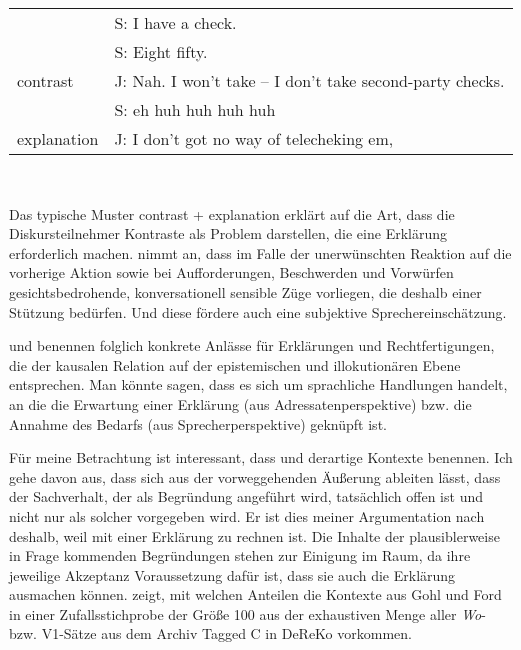 \begin{exe}
	\ex\label{1043} 
    \begin{tabular}[t]{ll}
	& S: I have a check.\\
	& S: Eight fifty.\\
	contrast & J: Nah. I won't take – I don't take second-party checks.\\
	& S: eh huh huh huh huh\\
	explanation & J: I don't got no way of telecheking  em,						 
    \end{tabular} \\
    \hbox{}\hfill\hbox{\citet[294]{Ford2000}} 
\end{exe}	
Das typische Muster contrast + explanation erklärt \citet[289]{Ford2000} auf die Art, dass die Diskursteilnehmer Kontraste als Problem darstellen, die eine Erklärung erforderlich machen. \citet[103]{Gohl2000} nimmt an, dass im Falle der uner\-wünschten Reaktion auf die vorherige Aktion sowie bei Aufforderungen, Be\-schwerden und Vorwürfen gesichtsbedrohende, konversationell sensible Züge vorliegen, die deshalb einer Stützung bedürfen. Und diese fördere auch eine subjektive Sprechereinschätzung.

\citet{Gohl2000} und \citet{Ford2000} benennen folglich konkrete Anlässe für Erklärungen und Rechtfertigungen, die der kausalen Relation auf der epistemischen und illokutionären  Ebene  entsprechen. Man könnte sagen, dass es sich um sprachliche Handlungen handelt, an die die Erwartung einer Erklärung (aus Adressaten\-perspektive) bzw. die Annahme des Bedarfs (aus Sprecherperspektive) geknüpft ist.

Für meine Betrachtung ist interessant, dass \citet{Ford1993, Ford2000} und \citet{Gohl2000} derartige Kontexte benennen. Ich gehe davon aus, dass sich aus der vorweggehenden Äußerung ableiten lässt, dass der Sachverhalt, der als Begründung angeführt wird, tatsächlich offen ist und nicht nur als solcher vorgegeben wird. Er ist dies meiner Argumentation nach deshalb, weil mit einer Erklärung zu rechnen ist. Die Inhalte der plausiblerweise in Frage kommenden Begründungen stehen zur Einigung im Raum, da ihre jeweilige Akzeptanz Voraussetzung dafür ist, dass sie auch die Erklärung ausmachen können.  zeigt, mit welchen Anteilen die Kontexte aus Gohl und Ford in einer Zufallsstichprobe der Größe 100 aus der exhaustiven Menge aller \textit{Wo}- bzw. V1-Sätze aus dem Archiv Tagged C in DeReKo vorkommen.

